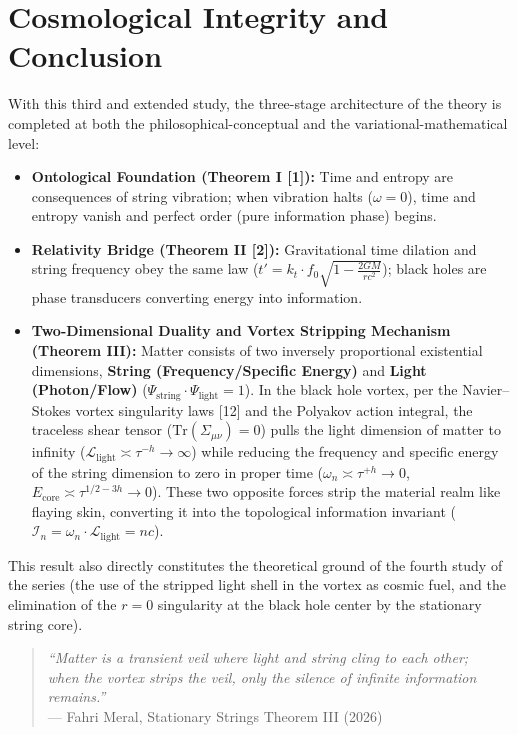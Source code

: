 \documentclass[12pt,a4paper]{article}
\begin{document}
\section{Cosmological Integrity and Conclusion}

With this third and extended study, the three-stage architecture of the theory is completed at both the philosophical-conceptual and the variational-mathematical level:

\begin{itemize}
    \item \textbf{Ontological Foundation (Theorem I [1]):} Time and entropy are consequences of string vibration; when vibration halts ($\omega = 0$), time and entropy vanish and perfect order (pure information phase) begins.
    \item \textbf{Relativity Bridge (Theorem II [2]):} Gravitational time dilation and string frequency obey the same law ($t' = k_t \cdot f_0 \sqrt{1 - \frac{2GM}{rc^2}}$); black holes are phase transducers converting energy into information.
    \item \textbf{Two-Dimensional Duality and Vortex Stripping Mechanism (Theorem III):} Matter consists of two inversely proportional existential dimensions, \textbf{String (Frequency/Specific Energy)} and \textbf{Light (Photon/Flow)} ($\Psi_{\text{string}} \cdot \Psi_{\text{light}} = 1$). In the black hole vortex, per the Navier--Stokes vortex singularity laws [12] and the Polyakov action integral, the traceless shear tensor ($\text{Tr}(\Sigma_{\mu\nu})=0$) pulls the light dimension of matter to infinity ($\mathcal{L}_{\text{light}} \asymp \tau^{-h} \to \infty$) while reducing the frequency and specific energy of the string dimension to zero in proper time ($\omega_n \asymp \tau^{+h} \to 0$, $E_{\text{core}} \asymp \tau^{1/2-3h} \to 0$). These two opposite forces strip the material realm like flaying skin, converting it into the topological information invariant ($\mathcal{I}_n = \omega_n \cdot \mathcal{L}_{\text{light}} = n c$).
\end{itemize}

This result also directly constitutes the theoretical ground of the fourth study of the series (the use of the stripped light shell in the vortex as cosmic fuel, and the elimination of the $r=0$ singularity at the black hole center by the stationary string core).

\begin{quote}
\textit{``Matter is a transient veil where light and string cling to each other;\\
when the vortex strips the veil, only the silence of infinite information remains.''}\\
--- Fahri Meral, Stationary Strings Theorem III (2026)
\end{quote}
\end{document}
